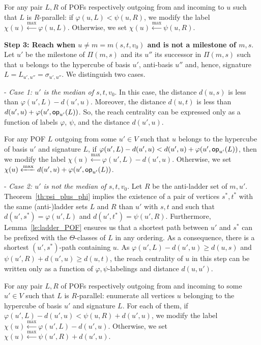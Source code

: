 \documentclass[a4paper,UKenglish,numberwithinsect,cleveref, autoref]{lipics-v2021}
\newcommand{\opp}{\mbox{\textsf{op}}}
\begin{document}
For any pair $L,R$ of POFs respectively outgoing from and incoming to $u$ such that $L$ is $R$-parallel: if $\varphi(u,L) < \psi(u,R)$, we modify the label $\chi(u) \xleftarrow{\max} \varphi(u,L)$. Otherwise, we set $\chi(u) \xleftarrow{\max} \psi(u,R)$.

\textbf{Step 3: Reach when $u\neq m=m(s,t,v_0)$ and is not a milestone of $m,s$}. Let $u'$ be the milestone of $\Pi(m,s)$ and its $u''$ its successor in $\Pi(m,s)$ such that $u$ belongs to the hypercube of basis $u'$, anti-basis $u''$ and, hence, signature $L = L_{u',u''} = \sigma_{u',u''}$. We distinguish two cases.

- \textit{Case 1: $u'$ is the median of $s,t,v_0$}. In this case, the distance $d(u,s)$ is less than $\varphi(u',L)-d(u',u)$. Moreover, the distance $d(u,t)$ is less than $d(u',u)+\varphi(u',\opp_{u'}(L))$. So, the  reach centrality can be expressed only as a function of labels $\varphi$, $\psi$, and the distance $d(u',u)$.

For any POF $L$ outgoing from some $u' \in V$ such that $u$ belongs to the hypercube of basis $u'$ and signature $L$, if $\varphi(u',L)-d(u',u) < d(u',u)+\varphi(u',\opp_{u'}(L))$, then we modify the label $\chi(u) \xleftarrow{\max} \varphi(u',L)-d(u',u)$. Otherwise, we set $\chi(u) \xleftarrow{\max} d(u',u)+\varphi(u',\opp_{u'}(L))$.

- \textit{Case 2: $u'$ is not the median of $s,t,v_0$}. Let $R$ be the anti-ladder set of $m,u'$. Theorem~\ref{th:psi_plus_phi} implies the existence of a pair of vertices $s^*,t^*$ with the same (anti-)ladder sets $L$ and $R$ than $u'$ with $s,t$ and such that $d(u',s^*) = \varphi(u',L)$ and $d(u',t^*) = \psi(u',R)$. Furthermore, Lemma~\ref{le:ladder_POF} ensures us that a shortest path between $u'$ and $s^*$ can be prefixed with the $\Theta$-classes of $L$ in any ordering. As a consequence, there is a shortest $(u',s^*)$-path containing $u$. As $\varphi(u',L)-d(u',u) \ge d(u,s)$ and $\psi(u',R) + d(u',u) \ge d(u,t)$, the  reach centrality of $u$ in this step can be written only as a function of  $\varphi,\psi$-labelings and distance $d(u,u')$.

For any pair $L,R$ of POFs respectively outgoing from and incoming to some $u' \in V$ such that $L$ is $R$-parallel: enumerate all vertices $u$ belonging to the hypercube of basis $u'$ and signature $L$. For each of them, if $\varphi(u',L)-d(u',u) < \psi(u,R)+d(u',u)$, we modify the label $\chi(u) \xleftarrow{\max} \varphi(u',L)-d(u',u)$. Otherwise, we set $\chi(u) \xleftarrow{\max} \psi(u',R)+d(u',u)$.
\end{document}
